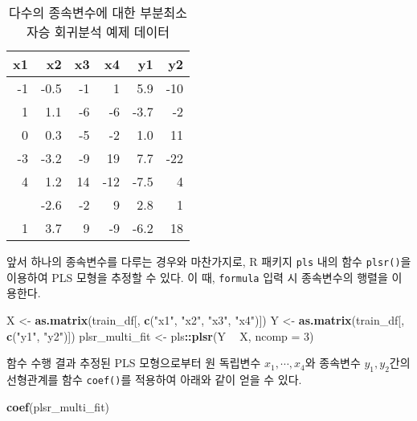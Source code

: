 \documentclass[]{book}
\newenvironment{Shaded}{\begin{snugshade}}{\end{snugshade}}
\newcommand{\DataTypeTok}[1]{\textcolor[rgb]{0.13,0.29,0.53}{#1}}
\newcommand{\DecValTok}[1]{\textcolor[rgb]{0.00,0.00,0.81}{#1}}
\newcommand{\KeywordTok}[1]{\textcolor[rgb]{0.13,0.29,0.53}{\textbf{#1}}}
\newcommand{\NormalTok}[1]{#1}
\newcommand{\OperatorTok}[1]{\textcolor[rgb]{0.81,0.36,0.00}{\textbf{#1}}}
\newcommand{\StringTok}[1]{\textcolor[rgb]{0.31,0.60,0.02}{#1}}
\begin{document}
\begin{table}[t]

\caption{\label{tab:plsr-multivariate-example-data}다수의 종속변수에 대한 부분최소자승 회귀분석 예제 데이터}
\centering
\begin{tabular}{rrrrrr}
\toprule
x1 & x2 & x3 & x4 & y1 & y2\\
\midrule
-1 & -0.5 & -1 & 1 & 5.9 & -10\\
1 & 1.1 & -6 & -6 & -3.7 & -2\\
0 & 0.3 & -5 & -2 & 1.0 & 11\\
-3 & -3.2 & -9 & 19 & 7.7 & -22\\
4 & 1.2 & 14 & -12 & -7.5 & 4\\
\addlinespace
-2 & -2.6 & -2 & 9 & 2.8 & 1\\
1 & 3.7 & 9 & -9 & -6.2 & 18\\
\bottomrule
\end{tabular}
\end{table}

앞서 하나의 종속변수를 다루는 경우와 마찬가지로, R 패키지 \texttt{pls} 내의 함수 \texttt{plsr()}을 이용하여 PLS 모형을 추정할 수 있다. 이 때, \texttt{formula} 입력 시 종속변수의 행렬을 이용한다.

\begin{Shaded}
\begin{Highlighting}[]
\NormalTok{X <-}\StringTok{ }\KeywordTok{as.matrix}\NormalTok{(train_df[, }\KeywordTok{c}\NormalTok{(}\StringTok{"x1"}\NormalTok{, }\StringTok{"x2"}\NormalTok{, }\StringTok{"x3"}\NormalTok{, }\StringTok{"x4"}\NormalTok{)])}
\NormalTok{Y <-}\StringTok{ }\KeywordTok{as.matrix}\NormalTok{(train_df[, }\KeywordTok{c}\NormalTok{(}\StringTok{"y1"}\NormalTok{, }\StringTok{"y2"}\NormalTok{)])}
\NormalTok{plsr_multi_fit <-}\StringTok{ }\NormalTok{pls}\OperatorTok{::}\KeywordTok{plsr}\NormalTok{(Y }\OperatorTok{~}\StringTok{ }\NormalTok{X, }\DataTypeTok{ncomp =} \DecValTok{3}\NormalTok{)}
\end{Highlighting}
\end{Shaded}

함수 수행 결과 추정된 PLS 모형으로부터 원 독립변수 \(x_1, \cdots, x_4\)와 종속변수 \(y_1, y_2\)간의 선형관계를 함수 \texttt{coef()}를 적용하여 아래와 같이 얻을 수 있다.

\begin{Shaded}
\begin{Highlighting}[]
\KeywordTok{coef}\NormalTok{(plsr_multi_fit)}
\end{Highlighting}
\end{Shaded}
\end{document}
